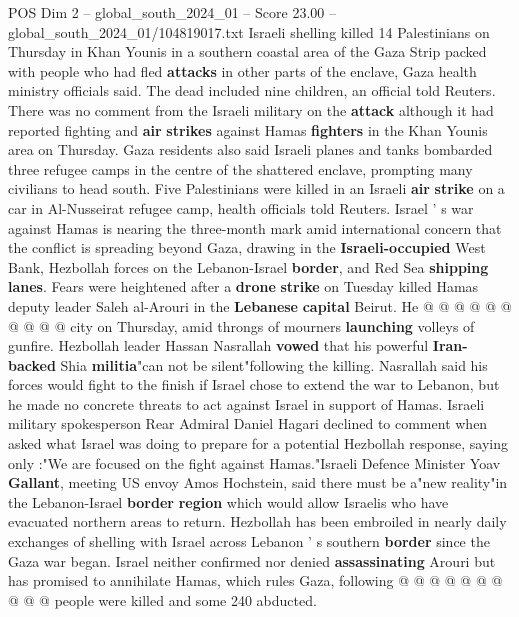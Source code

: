 \begin{textsample}{POS Dim 2 – global\_south\_2024\_01 – Score 23.00 – global\_south\_2024\_01/104819017.txt}  \label{ex:f2_pos_099}
Israeli shelling killed 14 Palestinians on Thursday in Khan Younis in a southern coastal area of the Gaza Strip packed with people who had fled \textbf{attacks} in other parts of the enclave, Gaza health ministry officials said.
The dead included nine children, an official told Reuters.
There was no comment from the Israeli military on the \textbf{attack} although it had reported fighting and \textbf{air} \textbf{strikes} against Hamas \textbf{fighters} in the Khan Younis area on Thursday.
Gaza residents also said Israeli planes and tanks bombarded three refugee camps in the centre of the shattered enclave, prompting many civilians to head south.
Five Palestinians were killed in an Israeli \textbf{air} \textbf{strike} on a car in Al-Nusseirat refugee camp, health officials told Reuters.
Israel ' s war against Hamas is nearing the three-month mark amid international concern that the conflict is spreading beyond Gaza, drawing in the \textbf{Israeli-occupied} West Bank, Hezbollah forces on the Lebanon-Israel \textbf{border}, and Red Sea \textbf{shipping} \textbf{lanes}.
Fears were heightened after a \textbf{drone} \textbf{strike} on Tuesday killed Hamas deputy leader Saleh al-Arouri in the \textbf{Lebanese} \textbf{capital} Beirut.
He @ @ @ @ @ @ @ @ @ @ city on Thursday, amid throngs of mourners \textbf{launching} volleys of gunfire.
Hezbollah leader Hassan Nasrallah \textbf{vowed} that his powerful \textbf{Iran-backed} Shia \textbf{militia}"can not be silent"following the killing.
Nasrallah said his forces would fight to the finish if Israel chose to extend the war to Lebanon, but he made no concrete threats to act against Israel in support of Hamas.
Israeli military spokesperson Rear Admiral Daniel Hagari declined to comment when asked what Israel was doing to prepare for a potential Hezbollah response, saying only :"We are focused on the fight against Hamas."Israeli Defence Minister Yoav \textbf{Gallant}, meeting US envoy Amos Hochstein, said there must be a"new reality"in the Lebanon-Israel \textbf{border} \textbf{region} which would allow Israelis who have evacuated northern areas to return.
Hezbollah has been embroiled in nearly daily exchanges of shelling with Israel across Lebanon ' s southern \textbf{border} since the Gaza war began.
Israel neither confirmed nor denied \textbf{assassinating} Arouri but has promised to annihilate Hamas, which rules Gaza, following @ @ @ @ @ @ @ @ @ @ people were killed and some 240 abducted.

\end{textsample}
